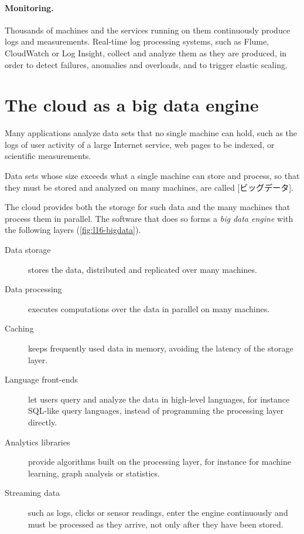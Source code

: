 \documentclass[../main.tex]{subfiles}
\begin{document}
\paragraph{Monitoring.}  Thousands of machines and the services running on
them continuously produce logs and measurements.  Real-time log processing
systems, such as Flume, CloudWatch or Log Insight, collect and analyze them
as they are produced, in order to detect failures, anomalies and overloads,
and to trigger elastic scaling.

\section{The cloud as a big data engine}
\label{sec:l16-bigdata}

Many applications analyze data sets that no single machine can hold, such as
the logs of user activity of a large Internet service, web pages to be
indexed, or scientific measurements.

\begin{definition}
  Data sets whose size exceeds what a single machine can store and process,
  so that they must be stored and analyzed on many machines, are called
  [ビッグデータ].
\end{definition}

The cloud provides both the storage for such data and the many machines that
process them in parallel.  The software that does so forms a \emph{big data
engine} with the following layers (\cref{fig:l16-bigdata}).
\begin{description}
  \item[Data storage] stores the data, distributed and replicated over many
    machines.
  \item[Data processing] executes computations over the data in parallel on
    many machines.
  \item[Caching] keeps frequently used data in memory, avoiding the latency of
    the storage layer.
  \item[Language front-ends] let users query and analyze the data in
    high-level languages, for instance SQL-like query languages, instead of
    programming the processing layer directly.
  \item[Analytics libraries] provide algorithms built on the processing
    layer, for instance for machine learning, graph analysis or statistics.
  \item[Streaming data] such as logs, clicks or sensor readings, enter the
    engine continuously and must be processed as they arrive, not only after
    they have been stored.
\end{description}
\end{document}

